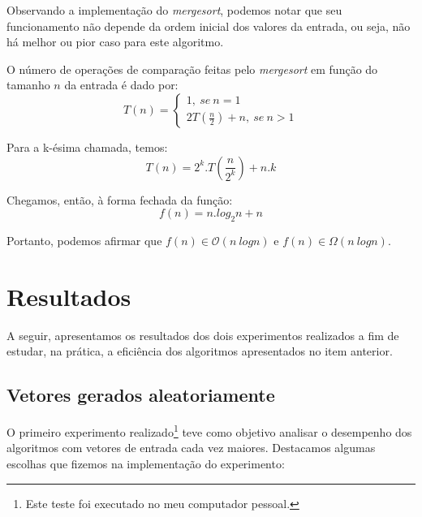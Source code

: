 \documentclass[fontsize=10pt]{article}
\begin{document}
\quad Observando a implementação do \textit{mergesort}, podemos notar que seu funcionamento não depende da ordem inicial dos valores da entrada, ou seja, não há melhor ou pior caso para este algoritmo.

\quad O número de operações de comparação feitas pelo \textit{mergesort} em função do tamanho $n$ da entrada é dado por:
\begin{equation}
T(n) =
\begin{cases}
1,\ se\ n = 1
\\ 2T(\frac{n}{2}) + n,\ se\ n>1
\end{cases}
\end{equation}

\quad Para a k-ésima chamada, temos:
\begin{equation}
    T(n) = 2^k.T(\frac{n}{2^k}) + n.k
\end{equation}

\quad Chegamos, então, à forma fechada da função:
\begin{equation}
    f(n) = n.log_2n + n
\end{equation}

\quad Portanto, podemos afirmar que $f(n) \in \mathcal{O}(n\ logn)$ e $f(n) \in \Omega(n\ logn)$.



\section{Resultados}

\quad A seguir, apresentamos os resultados dos dois experimentos realizados a fim de estudar, na prática, a eficiência dos algoritmos apresentados no item anterior.

\subsection{Vetores gerados aleatoriamente}

\quad O primeiro experimento realizado\footnote{Este teste foi executado no meu computador pessoal.} teve como objetivo analisar o desempenho dos algoritmos com vetores de entrada cada vez maiores. Destacamos algumas escolhas que fizemos na implementação do experimento:
\end{document}
